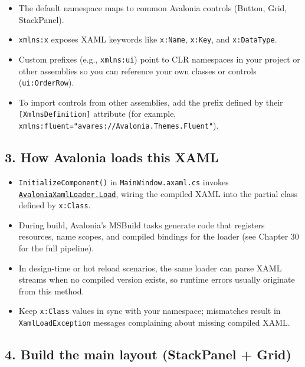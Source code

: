 \begin{itemize}
\tightlist
\item
  The default namespace maps to common Avalonia controls (Button, Grid,
  StackPanel).
\item
  \passthrough{\lstinline!xmlns:x!} exposes XAML keywords like
  \passthrough{\lstinline!x:Name!}, \passthrough{\lstinline!x:Key!}, and
  \passthrough{\lstinline!x:DataType!}.
\item
  Custom prefixes (e.g., \passthrough{\lstinline!xmlns:ui!}) point to
  CLR namespaces in your project or other assemblies so you can
  reference your own classes or controls
  (\passthrough{\lstinline!ui:OrderRow!}).
\item
  To import controls from other assemblies, add the prefix defined by
  their \passthrough{\lstinline![XmlnsDefinition]!} attribute (for
  example,
  \passthrough{\lstinline!xmlns:fluent="avares://Avalonia.Themes.Fluent"!}).
\end{itemize}

\subsection{3. How Avalonia loads this
XAML}\label{how-avalonia-loads-this-xaml}

\begin{itemize}
\tightlist
\item
  \passthrough{\lstinline!InitializeComponent()!} in
  \passthrough{\lstinline!MainWindow.axaml.cs!} invokes
  \href{https://github.com/AvaloniaUI/Avalonia/blob/master/src/Markup/Avalonia.Markup.Xaml/AvaloniaXamlLoader.cs}{\passthrough{\lstinline!AvaloniaXamlLoader.Load!}},
  wiring the compiled XAML into the partial class defined by
  \passthrough{\lstinline!x:Class!}.
\item
  During build, Avalonia's MSBuild tasks generate code that registers
  resources, name scopes, and compiled bindings for the loader (see
  Chapter 30 for the full pipeline).
\item
  In design-time or hot reload scenarios, the same loader can parse XAML
  streams when no compiled version exists, so runtime errors usually
  originate from this method.
\item
  Keep \passthrough{\lstinline!x:Class!} values in sync with your
  namespace; mismatches result in
  \passthrough{\lstinline!XamlLoadException!} messages complaining about
  missing compiled XAML.
\end{itemize}

\subsection{4. Build the main layout (StackPanel +
Grid)}\label{build-the-main-layout-stackpanel-grid}

